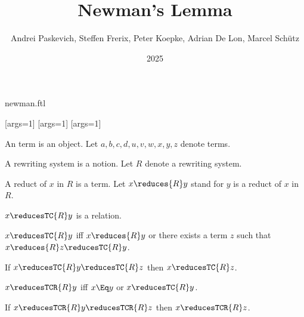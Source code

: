 \documentclass{stex}
\title{Newman's Lemma}
\author{Andrei Paskevich, Steffen Frerix, Peter Koepke, Adrian De Lon, Marcel Schütz}
\date{2025}
\begin{document}
\begin{smodule}{newman.ftl}
\maketitle
  

[args=1]{}
[args=1]{}
[args=1]{}


\begin{forthel}

  \begin{signature}[title=Term]
    An term is an object.
    Let $a,b,c,d,u,v,w,x,y,z$ denote terms.
  \end{signature}

  \begin{signature}[title=Rewriting System]
    A rewriting system is a notion.
    Let $R$ denote a rewriting system.
  \end{signature}

  \begin{signature}[title=Reduct]
    A reduct of $x$ in $R$ is a term.
    Let $x \reduces{R} y$ stand for $y$ is a reduct of $x$ in $R$.
  \end{signature}

  \begin{signature}
    $x \reducesTC{R} y$ is a relation.
  \end{signature}

  \begin{axiom}
    $x \reducesTC{R} y$ iff $x \reduces{R} y$ or there exists a term $z$ such that $x \reduces{R} z \reducesTC{R} y$.
  \end{axiom}

  \begin{axiom}
    If $x \reducesTC{R} y \reducesTC{R} z$ then $x \reducesTC{R} z$.
  \end{axiom}

  \begin{definition}
    $x \reducesTCR{R} y$ iff $x \Eq y$ or $x \reducesTC{R} y$.
  \end{definition}

  \begin{lemma}
    If $x \reducesTCR{R} y \reducesTCR{R} z$ then $x \reducesTCR{R} z$.
  \end{lemma}


\end{forthel}
\end{smodule}
\end{document}
